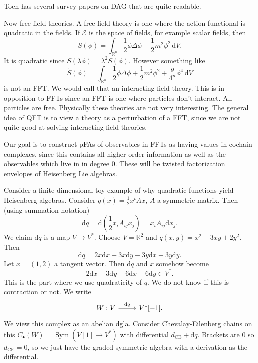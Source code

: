 Toen has several survey papers on DAG that are quite readable.

Now free field theories. A free field theory is one where the action functional is quadratic in the fields. If $\mathcal{E} $ is the space of fields, for example scalar fields, then
\[
	S(\phi )= \int_{\mathbb{R} ^n} \frac{1}{2} \phi \Delta \phi +\frac{1}{2} m^2\phi ^2\,\mathrm{d} V
.\]
It is quadratic since $S(\lambda \phi )=\lambda ^2S(\phi )$. However something like
\[
	\widetilde{S} (\phi )=\int_{\mathbb{R} ^n} \frac{1}{2} \phi \Delta \phi +\frac{1}{2} m^2\phi ^2+\frac{g}{4^n} \phi ^4 \,\mathrm{d} V
\]
is not an FFT. We would call that an interacting field theory. This is in opposition to FFTs since an FFT is one where particles don't interact. All particles are free. Physically these theories are not very interesting. The general idea of QFT is to view a theory as a perturbation of a FFT, since we are not quite good at solving interacting field theories.

Our goal is to construct pFAs of observables in FFTs as having values in cochain complexes, since this contains all higher order information as well as the observables which live in in degree 0. These will be twisted factorization envelopes of Heisenberg Lie algebras.

Consider a finite dimensional toy example of why quadratic functions yield Heisenberg algebras. Consider $q(x)=\frac{1}{2} x^tAx$, $A$ a symmetric matrix. Then (using summation notation)
\[
	\mathrm{d} q = \mathrm{d} \left( \frac{1}{2} x_iA_{ij} x_j \right) =x_i A_{ij} \mathrm{d} x_j
.\]
We claim $ \mathrm{d} q$ is a map $V\to V^*$. Choose $V=\mathbb{R} ^2$ and $q(x,y) = x^2 - 3xy + 2y^2$. Then
\[
	\mathrm{d} q = 2x\mathrm{d} x - 3x\mathrm{d} y - 3y\mathrm{d} x + 3y\mathrm{d} y
.\]
Let $x=(1,2)$ a tangent vector. Then $\mathrm{d} q$ and $x$ somehow become
\[
	2\mathrm{d} x - 3\mathrm{d} y - 6\mathrm{d} x + 6\mathrm{d}y\in V^*
.\]
This is the part where we use quadraticity of $q$. We do not know if this is contraction or not. We write
\[\begin{tikzcd}[row sep = 2.5em, column sep = 2.5em]
	W : V\ar["  \mathrm{d} q", r]  & V^*[-1].
\end{tikzcd}\]
We view this complex as an abelian dgla. Consider Chevalay-Eilenberg chains on this $C_{\bullet} (W)=\operatorname{Sym} (V[1]\to V^*)$ with differential $d_{\mathrm{CE} } +\mathrm{d} q$. Brackets are 0 so $d_{\mathrm{CE} } =0$, so we just have the graded symmetric algebra with a derivation as the differential.

